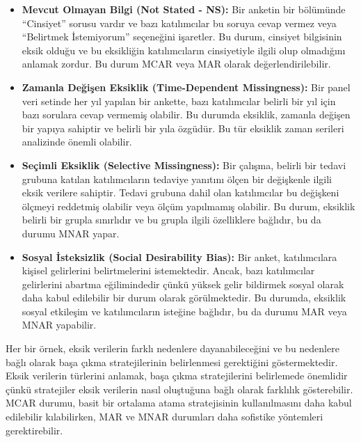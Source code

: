 \documentclass[
  letterpaper,
  DIV=11,
  numbers=noendperiod]{scrreprt}
\begin{document}
\begin{itemize}
\item
  \textbf{Mevcut Olmayan Bilgi (Not Stated - NS):} Bir anketin bir
  bölümünde ``Cinsiyet'' sorusu vardır ve bazı katılımcılar bu soruya
  cevap vermez veya ``Belirtmek İstemiyorum'' seçeneğini işaretler. Bu
  durum, cinsiyet bilgisinin eksik olduğu ve bu eksikliğin
  katılımcıların cinsiyetiyle ilgili olup olmadığını anlamak zordur. Bu
  durum MCAR veya MAR olarak değerlendirilebilir.
\item
  \textbf{Zamanla Değişen Eksiklik (Time-Dependent Missingness):} Bir
  panel veri setinde her yıl yapılan bir ankette, bazı katılımcılar
  belirli bir yıl için bazı sorulara cevap vermemiş olabilir. Bu durumda
  eksiklik, zamanla değişen bir yapıya sahiptir ve belirli bir yıla
  özgüdür. Bu tür eksiklik zaman serileri analizinde önemli olabilir.
\item
  \textbf{Seçimli Eksiklik (Selective Missingness):} Bir çalışma,
  belirli bir tedavi grubuna katılan katılımcıların tedaviye yanıtını
  ölçen bir değişkenle ilgili eksik verilere sahiptir. Tedavi grubuna
  dahil olan katılımcılar bu değişkeni ölçmeyi reddetmiş olabilir veya
  ölçüm yapılmamış olabilir. Bu durum, eksiklik belirli bir grupla
  sınırlıdır ve bu grupla ilgili özelliklere bağlıdır, bu da durumu MNAR
  yapar.
\item
  \textbf{Sosyal İsteksizlik (Social Desirability Bias):} Bir anket,
  katılımcılara kişisel gelirlerini belirtmelerini istemektedir. Ancak,
  bazı katılımcılar gelirlerini abartma eğilimindedir çünkü yüksek gelir
  bildirmek sosyal olarak daha kabul edilebilir bir durum olarak
  görülmektedir. Bu durumda, eksiklik sosyal etkileşim ve katılımcıların
  isteğine bağlıdır, bu da durumu MAR veya MNAR yapabilir.
\end{itemize}

Her bir örnek, eksik verilerin farklı nedenlere dayanabileceğini ve bu
nedenlere bağlı olarak başa çıkma stratejilerinin belirlenmesi
gerektiğini göstermektedir. Eksik verilerin türlerini anlamak, başa
çıkma stratejilerini belirlemede önemlidir çünkü stratejiler eksik
verilerin nasıl oluştuğuna bağlı olarak farklılık gösterebilir. MCAR
durumu, basit bir ortalama atama stratejisinin kullanılmasını daha kabul
edilebilir kılabilirken, MAR ve MNAR durumları daha sofistike yöntemleri
gerektirebilir.
\end{document}
